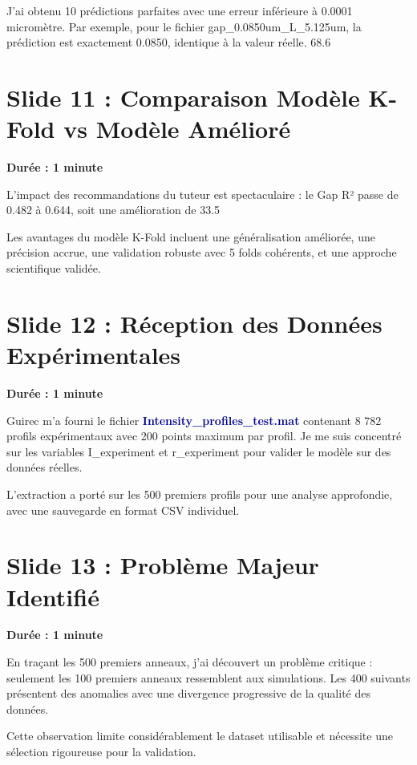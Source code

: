 \documentclass[12pt,a4paper]{article}
\begin{document}
J'ai obtenu 10 prédictions parfaites avec une erreur inférieure à 0.0001 micromètre. Par exemple, pour le fichier gap\_0.0850um\_L\_5.125um, la prédiction est exactement 0.0850, identique à la valeur réelle. 68.6%

\section{Slide 11 : Comparaison Modèle K-Fold vs Modèle Amélioré}
\textbf{Durée : 1 minute}

L'impact des recommandations du tuteur est spectaculaire : le Gap R² passe de 0.482 à 0.644, soit une amélioration de 33.5%

Les avantages du modèle K-Fold incluent une généralisation améliorée, une précision accrue, une validation robuste avec 5 folds cohérents, et une approche scientifique validée.

\section{Slide 12 : Réception des Données Expérimentales}
\textbf{Durée : 1 minute}

Guirec m'a fourni le fichier \textcolor{darkblue}{\textbf{Intensity\_profiles\_test.mat}} contenant 8 782 profils expérimentaux avec 200 points maximum par profil. Je me suis concentré sur les variables I\_experiment et r\_experiment pour valider le modèle sur des données réelles.

L'extraction a porté sur les 500 premiers profils pour une analyse approfondie, avec une sauvegarde en format CSV individuel.

\section{Slide 13 : Problème Majeur Identifié}
\textbf{Durée : 1 minute}

En traçant les 500 premiers anneaux, j'ai découvert un problème critique : seulement les 100 premiers anneaux ressemblent aux simulations. Les 400 suivants présentent des anomalies avec une divergence progressive de la qualité des données.

Cette observation limite considérablement le dataset utilisable et nécessite une sélection rigoureuse pour la validation.
\end{document}
